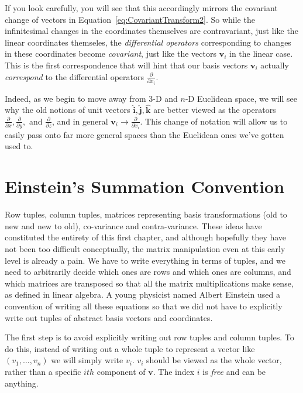 \documentclass[../master.tex]{subfiles}
\begin{document}
	If you look carefully, you will see that this accordingly mirrors the covariant change of vectors in Equation~\eqref{eq:CovariantTransform2}. So while the infinitesimal changes in the coordinates themselves are contravariant, just like the linear coordinates themseles, the \emph{differential operators} corresponding to changes in these coordinates become \emph{covariant}, just like the vectors $\mathbf v_i$ in the linear case. This is the first correspondence that will hint that our basis vectors $\mathbf v_i$ actually \emph{correspond} to the differential operators $\frac{\partial}{\partial x_i}$.
	
	Indeed, as we begin to move away from 3-D and $n$-D Euclidean space, we will see why the old notions of unit vectors $\mathbf{\hat i}, \mathbf{\hat j}, \mathbf{\hat k}$ are better viewed as the operators $\frac{\partial}{\partial x}, \frac{\partial}{\partial y},$ and $ \frac{\partial}{\partial z}$, and in general $\mathbf v_i \rightarrow \frac{\partial}{\partial x_i}$. This change of notation will allow us to easily pass onto far more general spaces than the Euclidean ones we've gotten used to. 
	
	
	\section{Einstein's Summation Convention} %
	\label{sec:einstein's_summation_convention}
	
	Row tuples, column tuples, matrices representing basis transformations (old to new and new to old), co-variance and contra-variance. These ideas have constituted the entirety of this first chapter, and although hopefully they have not been too difficult conceptually, the matrix manipulation even at this early level is already a pain. We have to write everything in terms of tuples, and we need to arbitrarily decide which ones are rows and which ones are columns, and which matrices are transposed so that all the matrix multiplications make sense, as defined in linear algebra. A young physicist named Albert Einstein used a convention of writing all these equations so that we did not have to explicitly write out tuples of abstract basis vectors and coordinates.
	
	The first step is to avoid explicitly writing out row tuples and column tuples. To do this, instead of writing out a whole tuple to represent a vector like $(v_1, \dots, v_n)$ we will simply write $v_i$. $v_i$ should be viewed as the whole vector, rather than a specific $ith$ component of $\mathbf v$. The index $i$ is \emph{free} and can be anything. 
	
\end{document}
